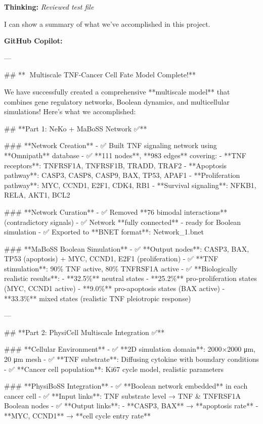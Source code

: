 \documentclass[11pt,a4paper]{article}
\begin{document}
\begin{thinkbox}
\textbf{Thinking:} \textit{Reviewed test file}

I can show a summary of what we've accomplished in this project.

\end{thinkbox}
\begin{copilotbox}
\textbf{GitHub Copilot:}

---

\#\# **🎉 Multiscale TNF-Cancer Cell Fate Model Complete!**

We have successfully created a comprehensive **multiscale model** that combines gene regulatory networks, Boolean dynamics, and multicellular simulations! Here's what we accomplished:

\#\# **Part 1: NeKo + MaBoSS Network ✅**

\#\#\# **Network Creation**
- ✅ Built TNF signaling network using **Omnipath** database
- ✅ **111 nodes**, **983 edges** covering:
  - **TNF receptors**: TNFRSF1A, TNFRSF1B, TRADD, TRAF2
  - **Apoptosis pathway**: CASP3, CASP8, CASP9, BAX, TP53, APAF1  
  - **Proliferation pathway**: MYC, CCND1, E2F1, CDK4, RB1
  - **Survival signaling**: NFKB1, RELA, AKT1, BCL2

\#\#\# **Network Curation**
- ✅ Removed **76 bimodal interactions** (contradictory signals)
- ✅ Network **fully connected** - ready for Boolean simulation
- ✅ Exported to **BNET format**: Network\_1.bnet

\#\#\# **MaBoSS Boolean Simulation**  
- ✅ **Output nodes**: CASP3, BAX, TP53 (apoptosis) + MYC, CCND1, E2F1 (proliferation)
- ✅ **TNF stimulation**: 90\% TNF active, 80\% TNFRSF1A active
- ✅ **Biologically realistic results**:
  - **32.5\%** neutral states  
  - **25.2\%** pro-proliferation states (MYC, CCND1 active)
  - **9.0\%** pro-apoptosis states (BAX active)  
  - **33.3\%** mixed states (realistic TNF pleiotropic response)

---

\#\# **Part 2: PhysiCell Multiscale Integration ✅**

\#\#\# **Cellular Environment**
- ✅ **2D simulation domain**: 2000×2000 μm, 20 μm mesh
- ✅ **TNF substrate**: Diffusing cytokine with boundary conditions
- ✅ **Cancer cell population**: Ki67 cycle model, realistic parameters

\#\#\# **PhysiBoSS Integration**
- ✅ **Boolean network embedded** in each cancer cell
- ✅ **Input links**: TNF substrate level → TNF \& TNFRSF1A Boolean nodes 
- ✅ **Output links**: 
  - **CASP3, BAX** → **apoptosis rate**
  - **MYC, CCND1** → **cell cycle entry rate**


\end{copilotbox}
\end{document}
